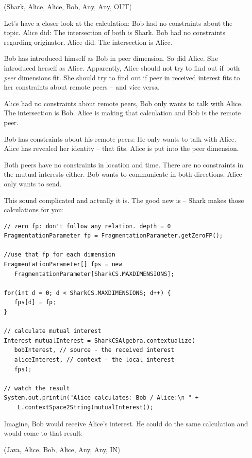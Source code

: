(Shark, Alice, Alice, Bob, Any, Any, OUT)

Let's have a closer look at the calculation: Bob had no constraints about the topic. Alice did: The intersection of both is Shark. Bob had no constraints regarding originator. Alice did. The intersection is Alice.

Bob has introduced himself as Bob in peer dimension. So did Alice. She introduced herself as Alice. Apparently, Alice should not try to find out if both {\it peer} dimensions fit. She should try to find out if peer in received interest fits to her constraints about remote peers -- and vice versa.

Alice had no constraints about remote peers, Bob only wants to talk with Alice. The intersection is Bob. Alice is making that calculation and Bob is the remote peer.

Bob has constraints about his remote peers: He only wants to talk with Alice. Alice has revealed her identity -- that fits. Alice is put into the peer dimension.

Both peers have no constraints in location and time. There are no constraints in the mutual interests either. Bob wants to communicate in both directions. Alice only wants to send.

This sound complicated and actually it is. The good new is -- Shark makes those calculations for you:

\begin{verbatim}
// zero fp: don't follow any relation. depth = 0
FragmentationParameter fp = FragmentationParameter.getZeroFP();

//use that fp for each dimension
FragmentationParameter[] fps = new    
   FragmentationParameter[SharkCS.MAXDIMENSIONS];

for(int d = 0; d < SharkCS.MAXDIMENSIONS; d++) {
   fps[d] = fp;
}

// calculate mutual interest
Interest mutualInterest = SharkCSAlgebra.contextualize(
   bobInterest, // source - the received interest
   aliceInterest, // context - the local interest
   fps);

// watch the result
System.out.println("Alice calculates: Bob / Alice:\n " + 
    L.contextSpace2String(mutualInterest));

\end{verbatim}

Imagine, Bob would receive Alice's interest. He could do the same calculation and would come to that result:

(Java, Alice, Bob, Alice, Any, Any, IN)

